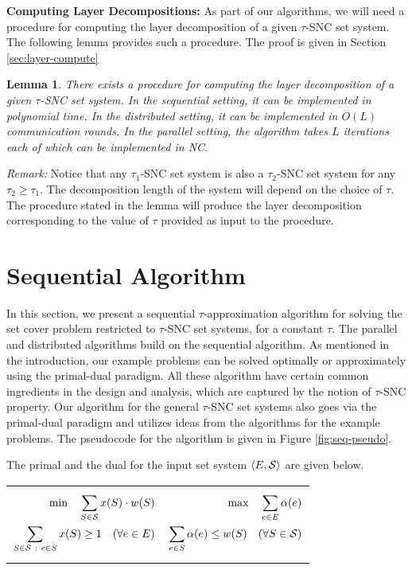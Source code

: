 \documentclass[11pt]{article}
\newtheorem{lemma}[theorem]{\bf Lemma}
\newcommand{\calS} {{\cal S}}
\newcommand{\pair}[2] {\langle #1, #2\rangle}
\begin{document}
{\bf Computing Layer Decompositions: }
As part of our algorithms, we will need a procedure for computing the layer decomposition of a 
given $\tau$-SNC set system. The following lemma provides such a procedure. 
The proof is given in Section \ref{sec:layer-compute}

\begin{lemma}
\label{lem:TTT}
There exists a procedure for computing the layer decomposition of a given $\tau$-SNC set system.
In the sequential setting, it can be implemented in polynomial time.
In the distributed setting, it can be implemented in $O(L)$ communication rounds.
In the parallel setting, the algorithm takes $L$ iterations each of which can be implemented in NC.
\end{lemma}

{\it Remark: }Notice that any $\tau_1$-SNC set system is also a $\tau_2$-SNC set system
for any $\tau_2\geq \tau_1$. The decomposition length of the system will depend on the choice of $\tau$.
The procedure stated in the lemma will produce the layer decomposition corresponding to the value of $\tau$ provided 
as input to the procedure.

\section{Sequential Algorithm}
In this section, we present a sequential $\tau$-approximation algorithm for solving the set cover problem
restricted to $\tau$-SNC set systems, for a constant $\tau$.
The parallel and distributed algorithms build on the sequential algorithm.
As mentioned in the introduction, our example problems
can be solved optimally or approximately using the primal-dual paradigm. 
All these algorithm have certain common ingredients in the design and analysis,
which are captured by the notion of $\tau$-SNC property.
Our algorithm for the general $\tau$-SNC set systems 
also goes via the primal-dual paradigm and utilizes ideas from the algorithms for the example problems.
The pseudocode for the algorithm is given in Figure \ref{fig:seq-pseudo}.

The primal and the dual for the input set system $\pair{E}{\calS}$ are given below.

\begin{tabular}{p{3in}p{3in}}
\begin{eqnarray*}
\min \quad \sum_{S \in \calS} x(S) \cdot w(S) \\
\sum_{S\in \calS ~:~ e \in S} x(S)  \geq  1 \quad  (\forall e\in E) 
\end{eqnarray*}
&
\begin{eqnarray*}
\max \quad \sum_{e \in E} \alpha(e) \\
\sum_{e\in S} \alpha(e)  \leq  w(S) \quad (\forall S\in \calS)
\end{eqnarray*}
\end{tabular}
\end{document}
